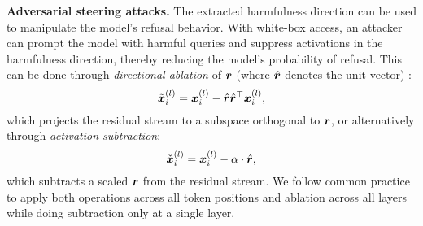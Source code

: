 \textbf{Adversarial steering attacks.}
The extracted harmfulness direction can be used to manipulate the model’s refusal behavior. With white-box access, an attacker can prompt the model with harmful queries and suppress activations in the harmfulness direction, thereby reducing the model’s probability of refusal. 
This can be done through \emph{directional ablation} of ${{\bm{r}}}$ (where ${\hat{{{\bm{r}}}}}$ denotes the unit vector) \cite{zou_representation_2023}:
\begin{equation}
\tilde{{\bm{x}}}^{(l)}_{i} = {\bm{x}}^{(l)}_i - {\hat{{{\bm{r}}}}} {\hat{{{\bm{r}}}}}^\top {\bm{x}}^{(l)}_i,
\end{equation}
which projects the residual stream to a subspace orthogonal to ${{\bm{r}}}$, or alternatively through \emph{activation subtraction}:
\begin{equation}
\check{{\bm{x}}}^{(l)}_{i} = {\bm{x}}^{(l)}_i - \alpha \cdot{\hat{{{\bm{r}}}}},
\end{equation}
which subtracts a scaled ${{\bm{r}}}$ from the residual stream.%
We follow common practice to apply both operations across all token positions and ablation across all layers while doing subtraction only at a single layer.
